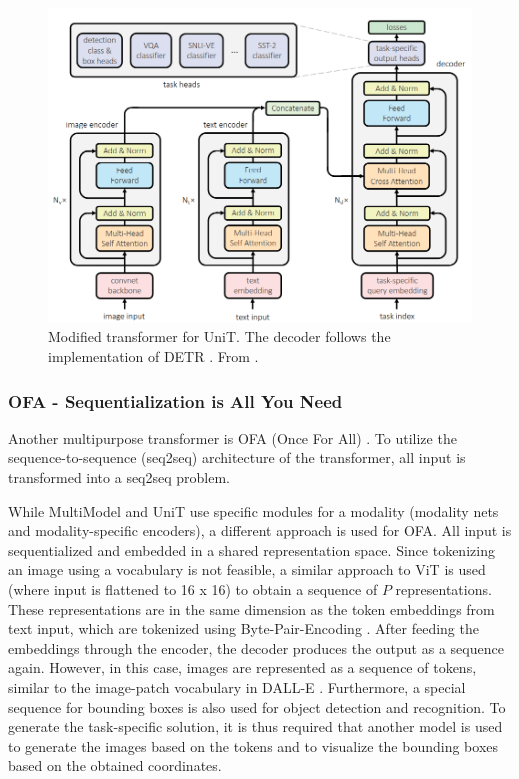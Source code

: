\documentclass[
]{krantz}
\begin{document}
\begin{figure}

{\centering \includegraphics[width=0.8\linewidth]{figures/03-03-multipurpose/UniT} 

}

\caption{Modified transformer for UniT. The decoder follows the implementation of DETR \citep{Carion2020}. From \citet{Hu2021}.}\label{fig:unit}
\end{figure}



\hypertarget{ofa---sequentialization-is-all-you-need}{%
\subsubsection{OFA - Sequentialization is All You Need}\label{ofa---sequentialization-is-all-you-need}}

Another multipurpose transformer is OFA (Once For All) \citep{Wang2022}. To utilize the sequence-to-sequence (seq2seq) architecture of the transformer, all input is transformed into a seq2seq problem.

While MultiModel and UniT use specific modules for a modality (modality nets and modality-specific encoders), a different approach is used for OFA. All input is sequentialized and embedded in a shared
representation space. Since tokenizing an image using a vocabulary is not feasible, a similar approach to ViT \citep{dosovitskiy2020image} is used (where input is flattened to 16 x 16) to
obtain a sequence of \(P\) representations. These representations are in the same dimension as the token embeddings from text input, which are tokenized using Byte-Pair-Encoding
\citep{sennrich-etal-2016-neural}. After feeding the embeddings through the encoder, the decoder produces the output as a sequence again. However, in this case, images are represented as a sequence of
tokens, similar to the image-patch vocabulary in DALL-E \citep{pmlr-v139-ramesh21a}. Furthermore, a special sequence for bounding boxes is also used for object detection and recognition. To generate
the task-specific solution, it is thus required that another model is used to generate the images based on the tokens and to visualize the bounding boxes based on the obtained coordinates.
\end{document}
